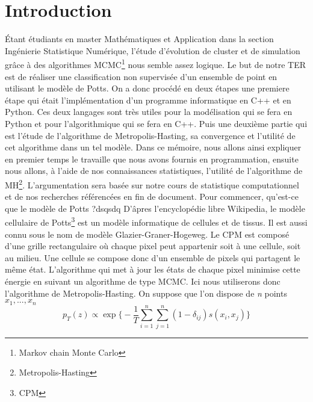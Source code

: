 \chapter*{Introduction}
\newcommand\tab[1][0.8cm]{\hspace*{#1}}

\begin{article}
    Étant étudiants en master Mathématiques et Application dans la section Ingénierie Statistique Numérique, l'étude d'évolution de cluster et de simulation grâce à des algorithmes MCMC\footnote{Markov chain Monte Carlo} nous semble assez logique.
Le but de notre TER est de réaliser une classification non supervisée d'un ensemble de point en utilisant le modèle de Potts.
On a donc procédé en deux étapes une premiere étape qui était l'implémentation d'un programme informatique en C++ et en Python.
Ces deux langages sont très utiles pour la modélisation qui se fera en Python et pour l'algorithmique qui se fera en C++.
Puis une deuxième partie qui est l'étude de l'algorithme de Metropolis-Hasting, sa convergence et l'utilité de cet algorithme dans un tel modèle.
Dans ce mémoire, nous allons ainsi expliquer en premier temps le travaille que nous avons fournis en programmation, ensuite nous allons, à l'aide de nos connaissances statistiques, l'utilité de l'algorithme de MH\footnote{Metropolis-Hasting}.
    \newline L'argumentation sera basée sur notre cours de statistique computationnel et de nos recherches référencées en fin de document.
    \newline \newline
    \tab Pour commencer, qu'est-ce que le modèle de Potts ?dsqsdq
    \newline D'âpres l'encyclopédie libre Wikipedia, le modèle cellulaire de Potts\footnote{CPM} est un modèle informatique de cellules et de tissus.
    Il est aussi connu sous le nom de modèle Glazier-Graner-Hogeweg.
    Le CPM est composé d'une grille rectangulaire où chaque pixel peut appartenir soit à une cellule, soit au milieu.
    Une cellule se compose donc d'un ensemble de pixels qui partagent le même état.
    L'algorithme qui met à jour les états de chaque pixel minimise cette énergie en suivant un algorithme de type MCMC.
    Ici nous utiliserons donc l'algorithme de Metropolis-Hasting.
    On suppose que l’on dispose de \textit{n} points $x_{1},...,x_{n}$
    \newline \[p_{T}(z)\propto\exp\Bigg\{-\frac{1}{T}\sum_{i=1}^{n}\sum_{j=1}^{n}(1-\delta_{ij})s(x_i,x_j)\Bigg\}\]
\end{article}